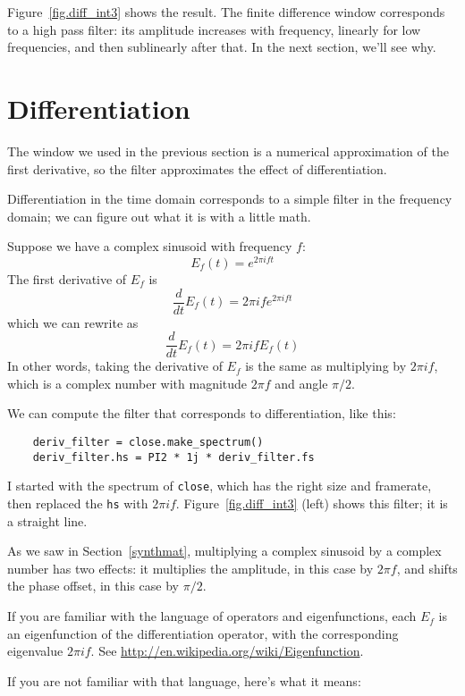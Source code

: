 Figure~\ref{fig.diff_int3} shows the result.  The finite difference
window corresponds to a high pass filter: its amplitude increases with
frequency, linearly for low frequencies, and then sublinearly after
that.  In the next section, we'll see why.


\section{Differentiation}
\label{effdiff}

The window we used in the previous section is a
numerical approximation of the first derivative, so the filter
approximates the effect of differentiation.

Differentiation in the time domain corresponds to a simple filter
in the frequency domain; we can figure out what it is with a little
math.

Suppose we have a complex sinusoid with frequency $f$:
%
\[ E_f(t) = e^{2 \pi i f t} \]
%
The first derivative of $E_f$ is
%
\[ \frac{d}{dt} E_f(t) = 2 \pi i f e^{2 \pi i f t} \]
%
which we can rewrite as
%
\[ \frac{d}{dt} E_f(t) = 2 \pi i f E_f(t) \]
%
In other words, taking the derivative of $E_f$ is the same
as multiplying by $2 \pi i f$, which is a complex number
with magnitude $2 \pi f$ and angle $\pi/2$.

We can compute the filter that corresponds to differentiation,
like this:

\begin{verbatim}
	deriv_filter = close.make_spectrum()
	deriv_filter.hs = PI2 * 1j * deriv_filter.fs
\end{verbatim}

I started with the spectrum of {\tt close}, which has the right
size and framerate, then replaced the {\tt hs} with $2 \pi i f$.
Figure~\ref{fig.diff_int3} (left) shows this filter; it is a straight line.

As we saw in Section~\ref{synthmat}, multiplying a complex sinusoid
by a complex number has two effects: it multiplies
the amplitude, in this case by $2 \pi f$, and shifts the phase
offset, in this case by $\pi/2$.

If you are familiar with the language of operators and eigenfunctions,
each $E_f$ is an eigenfunction of the differentiation operator, with the
corresponding eigenvalue $2 \pi i f$.  See
\url{http://en.wikipedia.org/wiki/Eigenfunction}.

If you are not familiar with that language, here's what it
means:

